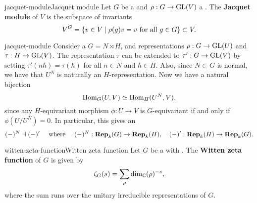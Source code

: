 \begin{topic}{jacquet-module}{Jacquet module}
    Let $G$ be a  and $\rho : G \to \textup{GL}(V)$ a . The \textbf{Jacquet module} of $V$ is the subspace of invariants
    \[ V^G = \{ v \in V \mid \rho(g) v = v \textup{ for all } g \in G \} \subset V . \]
\end{topic}

\begin{example}{jacquet-module}
    Consider a  $G = N \rtimes H$, and representations $\rho : G \to \textup{GL}(U)$ and $\tau : H \to \textup{GL}(V)$. The representation $\tau$ can be extended to $\tau' : G \to \textup{GL}(V)$ by setting $\tau'(nh) = \tau(h)$ for all $n \in N$ and $h \in H$. Also, since $N \subset G$ is normal, we have that $U^N$ is naturally an $H$-representation. Now we have a natural bijection
    \[ \text{Hom}_G(U, V) \simeq \text{Hom}_H(U^N, V) , \]
    since any $H$-equivariant morphism $\phi : U \to V$ is $G$-equivariant if and only if $\phi(U/U^N) = 0$. In particular, this gives an 
    \[ (-)^N \dashv (-)' \quad \textup{ where } \quad (-)^N : \textbf{Rep}_k(G) \to \textbf{Rep}_k(H), \quad (-)' : \textbf{Rep}_k(H) \to \textbf{Rep}_k(G) . \]
\end{example}

\begin{topic}{witten-zeta-function}{Witten zeta function}
    Let $G$ be a   with  . The \textbf{Witten zeta function} of $G$ is given by
    \[ \zeta_G(s) = \sum_{\rho} \dim_{\mathbb{C}} (\rho)^{-s} , \]
    where the sum runs over the unitary irreducible representations of $G$.
\end{topic}

